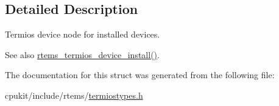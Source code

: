 \subsection{Detailed Description}
Termios device node for installed devices. 

\begin{DoxySeeAlso}{See also}
\mbox{\hyperlink{termiostypes_8h_aede46864d5d763fd7591830fefe22e1c}{rtems\+\_\+termios\+\_\+device\+\_\+install()}}. 
\end{DoxySeeAlso}


The documentation for this struct was generated from the following file\+:\begin{DoxyCompactItemize}
\item 
cpukit/include/rtems/\mbox{\hyperlink{termiostypes_8h}{termiostypes.\+h}}\end{DoxyCompactItemize}
